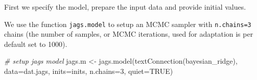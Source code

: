 \documentclass[
]{book}
\newenvironment{Shaded}{\begin{snugshade}}{\end{snugshade}}
\newcommand{\AttributeTok}[1]{\textcolor[rgb]{0.77,0.63,0.00}{#1}}
\newcommand{\CommentTok}[1]{\textcolor[rgb]{0.56,0.35,0.01}{\textit{#1}}}
\newcommand{\ConstantTok}[1]{\textcolor[rgb]{0.00,0.00,0.00}{#1}}
\newcommand{\ControlFlowTok}[1]{\textcolor[rgb]{0.13,0.29,0.53}{\textbf{#1}}}
\newcommand{\DecValTok}[1]{\textcolor[rgb]{0.00,0.00,0.81}{#1}}
\newcommand{\FunctionTok}[1]{\textcolor[rgb]{0.00,0.00,0.00}{#1}}
\newcommand{\NormalTok}[1]{#1}
\newcommand{\OtherTok}[1]{\textcolor[rgb]{0.56,0.35,0.01}{#1}}
\newcommand{\SpecialCharTok}[1]{\textcolor[rgb]{0.00,0.00,0.00}{#1}}
\newcommand{\StringTok}[1]{\textcolor[rgb]{0.31,0.60,0.02}{#1}}
\begin{document}
First we specify the model, prepare the input data and provide initial values.

\begin{Shaded}
\end{Shaded}

We use the function \texttt{jags.model} to setup an MCMC sampler with \texttt{n.chains=3} chains (the number of samples, or MCMC iterations, used for adaptation is per default set to 1000).

\begin{Shaded}
\begin{Highlighting}[]
\CommentTok{\# setup jags model}
\NormalTok{jags.m }\OtherTok{\textless{}{-}} \FunctionTok{jags.model}\NormalTok{(}\FunctionTok{textConnection}\NormalTok{(bayesian\_ridge),}
                     \AttributeTok{data=}\NormalTok{dat.jags,}
                     \AttributeTok{inits=}\NormalTok{inits,}
                     \AttributeTok{n.chains=}\DecValTok{3}\NormalTok{,}
                     \AttributeTok{quiet=}\ConstantTok{TRUE}\NormalTok{)}
\end{Highlighting}
\end{Shaded}
\end{document}
